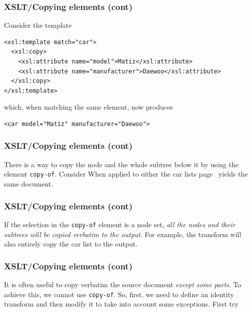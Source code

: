 %
\begin{frame}[containsverbatim]
\frametitle{XSLT/Copying elements (cont)}

Consider the template
{\small
\begin{verbatim}
<xsl:template match="car">
  <xsl:copy>
    <xsl:attribute name="model">Matiz</xsl:attribute>
    <xsl:attribute name="manufacturer">Daewoo</xsl:attribute>
  </xsl:copy>
</xsl:template>
\end{verbatim}
}
which, when matching the same element, now produces
{\small
\begin{verbatim}
<car model="Matiz" manufacturer="Daewoo">
\end{verbatim}
}

\end{frame}

%
\begin{frame}
\frametitle{XSLT/Copying elements (cont)}

There is a way to copy the node and the whole subtree below it by using
the \XSLT element \texttt{copy-of}. Consider
When applied to either the car lists page~\pageref{cars} yields the
same document.

\end{frame}

%
\begin{frame}
\frametitle{XSLT/Copying elements (cont)}

If the selection in the \texttt{copy-of} element is a node set,
\emph{all the nodes and their subtrees will be copied verbatim to the
  output}. For example, the transform
will also entirely copy the car list to the output.

\end{frame}

%
\begin{frame}
\frametitle{XSLT/Copying elements (cont)}

It is often useful to copy verbatim the source document \emph{except
some parts}. To achieve this, we cannot use \texttt{copy-of}. So,
first, we need to define an identity transform and then modify it to
take into account some exceptions. First try

\end{frame}

